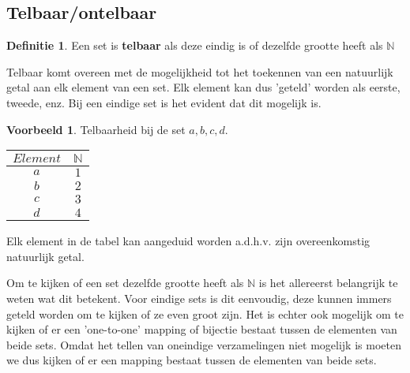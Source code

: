 \documentclass[12pt,a4paper]{article}
\theoremstyle{definition}
\newtheorem{defi}{Definitie}[section]
\newtheorem{vb}{Voorbeeld}[section]
\begin{document}
\subsection{Telbaar/ontelbaar}
	\begin{defi}
		Een set is \textbf{telbaar} als deze eindig is of dezelfde grootte heeft als $\mathbb{N}$
	\end{defi}
	
	Telbaar komt overeen met de mogelijkheid tot het toekennen van een natuurlijk getal aan elk element van een set. Elk element kan dus 'geteld' worden als eerste, tweede, enz. Bij een eindige set is het evident dat dit mogelijk is.
	\begin{vb}
		Telbaarheid bij de set ${a, b, c, d}$.
		\begin{table}[H]
			\centering
			\begin{tabular}{|c|c|}
				\hline $Element$ & $\mathbb{N}$ \\ 
				\hline $a$ & $1$ \\ 
				$b$ & $2$ \\ 
				$c$ & $3$ \\
				$d$ & $4$ \\  
				\hline 
			\end{tabular}
		\end{table}
		Elk element in de tabel kan aangeduid worden a.d.h.v. zijn overeenkomstig natuurlijk getal.	
	\end{vb}
	
	Om te kijken of een set dezelfde grootte heeft als $\mathbb{N}$ is het allereerst belangrijk te weten wat dit betekent. Voor eindige sets is dit eenvoudig, deze kunnen immers geteld worden om te kijken of ze even groot zijn. Het is echter ook mogelijk om te kijken of er een 'one-to-one' mapping of bijectie bestaat tussen de elementen van beide sets. Omdat het tellen van oneindige verzamelingen niet mogelijk is moeten we dus kijken of er een mapping bestaat tussen de elementen van beide sets.
	
\end{document}
